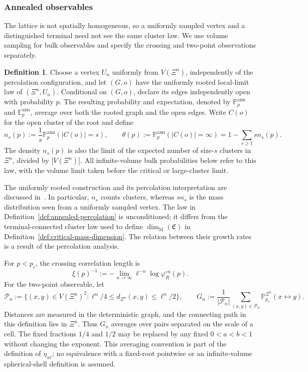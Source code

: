 \documentclass[scheme=plain,11pt]{ctexart}
\theoremstyle{definition}
\newtheorem{definition}[theorem]{Definition}
\theoremstyle{remark}
\newcommand{\dist}{d}
\newcommand{\dimmass}{\dim_{\mathrm M}}
\begin{document}
\subsubsection*{Annealed observables}
The lattice is not spatially homogeneous, so a uniformly sampled vertex and a distinguished terminal need not see the same cluster law.
We use volume sampling for bulk observables and specify the crossing and two-point observations separately.

\begin{definition}\label{def:physical-observables}\label{def:annealed-percolation}
Choose a vertex $U_n$ uniformly from $V(\Xi^n)$, independently of the percolation configuration, and let $(G,o)$ have the uniformly rooted local-limit law of $(\Xi^n,U_n)$.
Conditional on $(G,o)$, declare its edges independently open with probability $p$.
The resulting probability and expectation, denoted by $\mathbb P_p^{\mathrm{ann}}$ and $\mathbb E_p^{\mathrm{ann}}$, average over both the rooted graph and the open edges.
Write $C(o)$ for the open cluster of the root and define
\[
 n_s(p):=\frac1s\mathbb P_p^{\mathrm{ann}}(|C(o)|=s),\qquad
 \theta(p):=\mathbb P_p^{\mathrm{ann}}(|C(o)|=\infty)
 =1-\sum_{s\ge1}s n_s(p).
\]
The density $n_s(p)$ is also the limit of the expected number of size-$s$ clusters in $\Xi^n$, divided by $|V(\Xi^n)|$.
All infinite-volume bulk probabilities below refer to this law, with the volume limit taken before the critical or large-cluster limit.
\end{definition}

The uniformly rooted construction and its percolation interpretation are discussed in~\cite{alves2026percolation}.
In particular, $n_s$ counts clusters, whereas $s n_s$ is the mass distribution seen from a uniformly sampled vertex.
The law in Definition~\ref{def:annealed-percolation} is unconditioned; it differs from the terminal-connected cluster law used to define $\dimmass(\mathfrak C)$ in Definition~\ref{def:critical-mass-dimension}.
The relation between their growth rates is a result of the percolation analysis.

For $p<p_c$, the crossing correlation length is
\[
 \xi(p)^{-1}:=-\lim_{n\to\infty}\ell^{-n}
 \log\varphi_R^{\circ n}(p).
\]
For the two-point observable, let
\[
 \mathcal P_n:=\bigl\{(x,y)\in V(\Xi^n)^2:
 \ell^n/4\le\dist_{\Xi^n}(x,y)\le\ell^n/2\bigr\},\qquad
 G_n:=\frac1{|\mathcal P_n|}\sum_{(x,y)\in\mathcal P_n}
 \mathbb P_{p_c}^{\Xi^n}(x\leftrightarrow y).
\]
Distances are measured in the deterministic graph, and the connecting path in this definition lies in $\Xi^n$.
Thus $G_n$ averages over pairs separated on the scale of a cell.
The fixed fractions $1/4$ and $1/2$ may be replaced by any fixed $0<a<b<1$ without changing the exponent.
This averaging convention is part of the definition of $\eta_{\mathrm{av}}$; no equivalence with a fixed-root pointwise or an infinite-volume spherical-shell definition is assumed.
\end{document}
